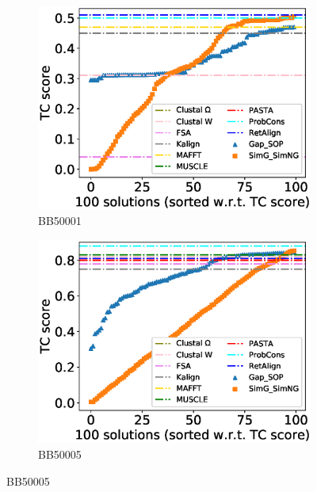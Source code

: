 \begin{figure}[!htbp]
	
	\begin{adjustwidth}{-1.5cm}{-1cm}
		\centering
		\begin{subfigure}{0.22\textwidth}
			\includegraphics[width=\columnwidth]{Figure/summary/precomputedInit/Balibase/BB50001_tc_density_single_run_2}
			\caption{BB50001}
		\end{subfigure}	
		\begin{subfigure}{0.22\textwidth}
			\includegraphics[width=\columnwidth]{Figure/summary/precomputedInit/Balibase/BB50005_tc_density_single_run_2}
			\caption{BB50005}
		\end{subfigure}

\end{adjustwidth}
\end{figure}
